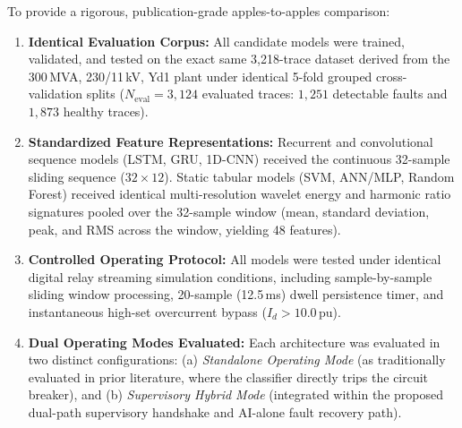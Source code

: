 \documentclass[12pt,a4paper,oneside]{report}
\begin{document}
To provide a rigorous, publication-grade apples-to-apples comparison:
\begin{enumerate}[leftmargin=1.6em,itemsep=2pt]
\item \textbf{Identical Evaluation Corpus:} All candidate models were trained, validated, and tested on the exact same 3{,}218-trace dataset derived from the 300\,MVA, 230/11\,kV, Yd1 plant under identical 5-fold grouped cross-validation splits ($N_{\text{eval}} = 3{,}124$ evaluated traces: $1{,}251$ detectable faults and $1{,}873$ healthy traces).
\item \textbf{Standardized Feature Representations:} Recurrent and convolutional sequence models (LSTM, GRU, 1D-CNN) received the continuous 32-sample sliding sequence ($32 \times 12$). Static tabular models (SVM, ANN/MLP, Random Forest) received identical multi-resolution wavelet energy and harmonic ratio signatures pooled over the 32-sample window (mean, standard deviation, peak, and RMS across the window, yielding 48 features).
\item \textbf{Controlled Operating Protocol:} All models were tested under identical digital relay streaming simulation conditions, including sample-by-sample sliding window processing, 20-sample (12.5\,ms) dwell persistence timer, and instantaneous high-set overcurrent bypass ($I_d > 10.0$\,pu).
\item \textbf{Dual Operating Modes Evaluated:} Each architecture was evaluated in two distinct configurations: (a) \textit{Standalone Operating Mode} (as traditionally evaluated in prior literature, where the classifier directly trips the circuit breaker), and (b) \textit{Supervisory Hybrid Mode} (integrated within the proposed dual-path supervisory handshake and AI-alone fault recovery path).
\end{enumerate}


\end{document}
